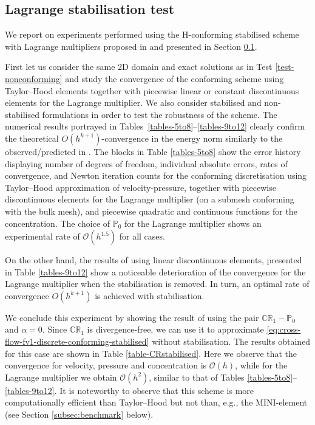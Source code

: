 \documentclass[onefignum,onetabnum,reqno,a4paper,final]{siamart250211}
\newcommand\0{\mathbf{0}}
\newcommand\bH{\boldsymbol{\mathrm{H}}}
\numberwithin{figure}{section}
\numberwithin{table}{section}
\begin{document}
\subsection{Lagrange stabilisation test}\label{subsec:lagrange-stabilisation-test}
{We report on experiments performed using the $\bH$-conforming stabilised scheme with Lagrange multipliers proposed in \cite{verfurth86} and presented in Section \ref{subsec:lagrange-stabilisation-test}. 
 

First let us consider the same 2D domain and exact solutions as in Test \ref{test-nonconforming} and study the convergence of the conforming scheme using Taylor--Hood elements together with piecewise linear or constant discontinuous elements for the Lagrange multiplier. We also consider  stabilised and non-stabilised formulations in order to test the robustness of the scheme. The numerical results portrayed in Tables~\ref{tables-5to8}--\ref{tables-9to12} clearly confirm the theoretical $O(h^{k+1})$-con\-ver\-gence in the energy norm similarly to the observed/predicted in  \cite{verfurth91,urquiza2014weak}. 
%
The blocks in Table \ref{tables-5to8} show the error history displaying number of degrees of freedom, individual absolute errors, rates of convergence, and Newton iteration counts for the conforming discretisation using Taylor--Hood approximation of velocity-pressure, together with piecewise discontinuous elements for the Lagrange multiplier (on a submesh conforming with the bulk mesh), and piecewise quadratic and continuous functions for the concentration. The choice of $\mathbb{P}_0$ for the Lagrange multiplier shows an experimental rate of $\mathcal{O}(h^{1.5})$ for all cases.

On the other hand, the results of using linear discontinuous elements, presented in Table \ref{tables-9to12} show a noticeable deterioration of the convergence  for the Lagrange multiplier  when the stabilisation is removed.  In turn, an optimal rate of convergence $O(h^{k+1})$ is achieved with stabilisation.  


We conclude this experiment by showing the result of using the pair $\mathbb{CR}_1-\mathbb{P}_0$ and $\alpha=0$. Since $\mathbb{CR}_1$ is divergence-free, we can use it to approximate \eqref{eq:cross-flow-fv1-discrete-conforming-stabilised} without stabilisation. The results obtained for this case are shown in Table \ref{table-CRstabilised}. Here we observe that the convergence for velocity, pressure and concentration is $\mathcal{O}(h)$, while for the Lagrange multiplier we obtain $\mathcal{O}(h^2)$, similar to that of Tables \ref{tables-5to8}--\ref{tables-9to12}. It is noteworthy to observe that this scheme is more computationally efficient than  Taylor--Hood but not than, e.g., the MINI-element (see Section \ref{subsec:benchmark} below).
 
}
\end{document}
